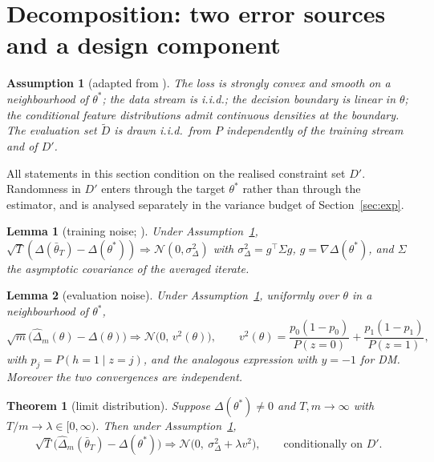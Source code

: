 \documentclass[pdflatex,sn-basic]{sn-jnl}
\newtheorem{theorem}{Theorem}
\newtheorem{lemma}{Lemma}
\newtheorem{assumption}{Assumption}
\newcommand{\dhat}{\hat\Delta}
\newcommand{\tbar}{\bar\theta}
\newcommand{\Dp}{D'}
\newcommand{\Dt}{\tilde D}
\begin{document}
\section{Decomposition: two error sources and a design component}
\label{sec:decomp}

\begin{assumption}[adapted from \citealp{roy2026uq}]
\label{ass:base}
The loss is strongly convex and smooth on a neighbourhood of $\theta^*$; the data stream is i.i.d.;
the decision boundary is linear in $\theta$; the conditional feature distributions admit continuous
densities at the boundary.  The evaluation set $\Dt$ is drawn i.i.d.\ from $P$ independently of the
training stream and of $\Dp$.
\end{assumption}

All statements in this section condition on the realised constraint set $\Dp$.  Randomness in $\Dp$
enters through the target $\theta^*$ rather than through the estimator, and is analysed separately
in the variance budget of Section~\ref{sec:exp}.

\begin{lemma}[training noise; \citealp{roy2026uq}]
\label{lem:train}
Under Assumption~\ref{ass:base},
$\sqrt T(\Delta(\tbar_T)-\Delta(\theta^*))\Rightarrow\mathcal N(0,\sigma^2_\Delta)$ with
$\sigma^2_\Delta=g^\top\Sigma g$, $g=\nabla\Delta(\theta^*)$, and $\Sigma$ the asymptotic covariance
of the averaged iterate.
\end{lemma}

\begin{lemma}[evaluation noise]
\label{lem:eval}
Under Assumption~\ref{ass:base}, uniformly over $\theta$ in a neighbourhood of $\theta^*$,
\[
\sqrt m\big(\dhat_m(\theta)-\Delta(\theta)\big)\Rightarrow\mathcal N\!\big(0,\,v^2(\theta)\big),
\qquad
v^2(\theta)=\frac{p_0(1-p_0)}{P(z=0)}+\frac{p_1(1-p_1)}{P(z=1)},
\]
with $p_j=P(h=1\mid z=j)$, and the analogous expression with $y=-1$ for DM.  Moreover the two
convergences are independent.
\end{lemma}

\begin{theorem}[limit distribution]
\label{thm:limit}
Suppose $\Delta(\theta^*)\neq0$ and $T,m\to\infty$ with $T/m\to\lambda\in[0,\infty)$.  Then under
Assumption~\ref{ass:base},
\[
\sqrt T\big(\dhat_m(\tbar_T)-\Delta(\theta^*)\big)\Rightarrow
\mathcal N\big(0,\ \sigma^2_\Delta+\lambda v^2\big),
\qquad\text{conditionally on }\Dp.
\]
\end{theorem}
\end{document}
